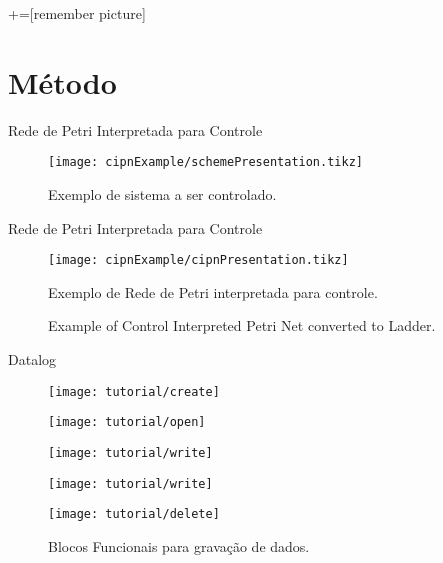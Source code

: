 
+=[remember picture]
\section{Método}

\begin{frame}{Rede de Petri Interpretada para Controle}
\begin{figure}[H]
  \centering
  \texttt{[image: cipnExample/schemePresentation.tikz]}
  \caption{Exemplo de sistema a ser controlado.}
  \label{fig:cipnexamplescheme}
\end{figure}
\end{frame}


\begin{frame}{Rede de Petri Interpretada para Controle}
\begin{figure}[H]
  \centering \texttt{[image: cipnExample/cipnPresentation.tikz]}
  \caption{Exemplo de Rede de Petri interpretada para controle.}
  \label{fig:cipnexample}
\end{figure}
\end{frame}

\begin{frame}
  \begin{figure}[H]
    \centering
  \caption{Example of Control Interpreted Petri Net converted to Ladder.}
  \label{fig:cipnexampleLadder}
\end{figure}
\end{frame}

\begin{frame}{Datalog}
   \begin{figure}[ht]
       \begin{minipage}[b]{0.3\linewidth}
         \centering
 \texttt{[image: tutorial/create]}
       \end{minipage}
       \begin{minipage}[b]{0.3\linewidth}
         \centering
 \texttt{[image: tutorial/open]}
\end{minipage}
       \begin{minipage}[b]{0.3\linewidth}
         \centering
	\texttt{[image: tutorial/write]}
       \end{minipage}
       \hspace{0.5cm}
       \begin{minipage}[b]{0.3\linewidth}
           \centering
	\texttt{[image: tutorial/write]}
       \end{minipage}
       \begin{minipage}[b]{0.3\linewidth}
           \centering
           \texttt{[image: tutorial/delete]}
       \end{minipage}
  \caption{Blocos Funcionais para gravação de dados.}
   \end{figure}
\end{frame}


